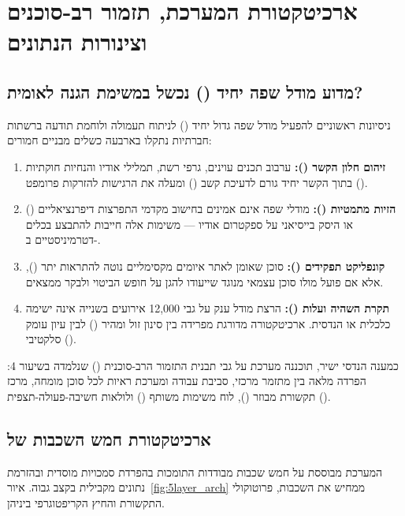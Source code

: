 \chapter{ארכיטקטורת המערכת, תזמור רב-סוכנים וצינורות הנתונים}
\label{ch:arch}

\section{מדוע מודל שפה יחיד () נכשל במשימת הגנה לאומית?}
ניסיונות ראשוניים להפעיל מודל שפה גדול יחיד () לניתוח תעמולה ולוחמת תודעה ברשתות חברתיות נתקלו בארבעה כשלים מבניים חמורים:
\begin{enumerate}
  \item \textbf{זיהום חלון הקשר ():} ערבוב תכנים עוינים, גרפי רשת, תמלילי אודיו והנחיות חוקתיות בתוך הקשר יחיד גורם לדעיכת קשב () ומעלה את הרגישות להזרקות פרומפט ().
  \item \textbf{הזיות מתמטיות ():} מודלי שפה אינם אמינים בחישוב מקדמי התפרצות דיפרנציאליים () או היסק בייסיאני על ספקטרום אודיו --- משימות אלה חייבות להתבצע בכלים דטרמיניסטיים ב-.
  \item \textbf{קונפליקט תפקידים ():} סוכן שאומן לאתר איומים מקסימליים נוטה להתראות יתר (), אלא אם פועל מולו סוכן עצמאי מנוגד שייעודו להגן על חופש הביטוי ולבקר ממצאים.
  \item \textbf{תקרת השהיה ועלות ():} הרצת מודל ענק על גבי 12,000 אירועים בשנייה אינה ישימה כלכלית או הנדסית. ארכיטקטורה מדורגת מפרידה בין סינון זול ומהיר () לבין עיון עומק סלקטיבי ().
\end{enumerate}

כמענה הנדסי ישיר, תוכננה מערכת  על גבי תבנית התזמור הרב-סוכנית () שנלמדה בשיעור 4: הפרדה מלאה בין מתזמר מרכזי, סביבת עבודה ומערכת ראיות לכל סוכן מומחה, מרכז תקשורת מבוזר (), לוח משימות משותף () ולולאות חשיבה-פעולה-תצפית ().

\section{ארכיטקטורת חמש השכבות של }
המערכת מבוססת על חמש שכבות מבודדות התומכות בהפרדת סמכויות מוסדית ובהזרמת נתונים מקבילית בקצב גבוה. איור~\ref{fig:5layer_arch} ממחיש את השכבות, פרוטוקולי התקשורת והחיץ הקריפטוגרפי ביניהן.

